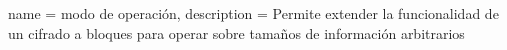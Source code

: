 %
%
%

\makeglossaries


%

{
  name = modo de operación,
  description = {
    Permite extender la funcionalidad de un cifrado a bloques para operar
    sobre tamaños de información arbitrarios
  }
}


%

